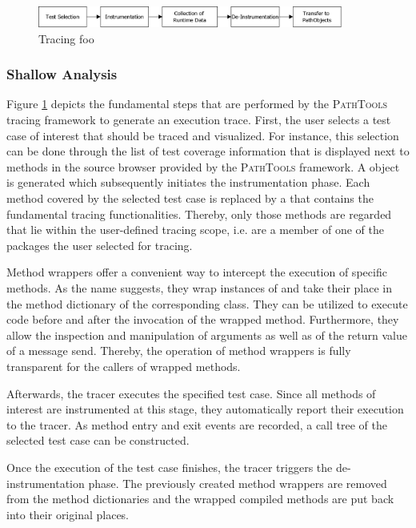 \begin{figure}[tb]
	\centering
	\includegraphics[width=0.9\textwidth]{../images/02-TracingProcess}
	\caption[TOC Caption]{Tracing foo}
	\label{fig:BackgroundTracingApproach}
\end{figure}

\subsubsection{Shallow Analysis}
Figure \ref{fig:BackgroundTracingApproach} depicts the fundamental steps that are performed by the \textsc{PathTools} tracing framework to generate an execution trace.
First, the user selects a test case of interest that should be traced and visualized.
For instance, this selection can be done through the list of test coverage information that is displayed next to methods in the source browser provided by the \textsc{PathTools} framework.
A  object is generated which subsequently initiates the instrumentation phase.
Each method covered by the selected test case is replaced by a  that contains the fundamental tracing functionalities.
Thereby, only those methods are regarded that lie within the user-defined tracing scope, i.e. are a member of one of the packages the user selected for tracing.

Method wrappers \cite{brant_wrappers_1998} offer a convenient way to intercept the execution of specific methods.
As the name suggests, they wrap instances of  and take their place in the method dictionary of the corresponding class.
They can be utilized to execute code before and after the invocation of the wrapped method.
Furthermore, they allow the inspection and manipulation of arguments as well as of the return value of a message send.
Thereby, the operation of method wrappers is fully transparent for the callers of wrapped methods.

Afterwards, the tracer executes the specified test case.
Since all methods of interest are instrumented at this stage, they automatically report their execution to the tracer.
As method entry and exit events are recorded, a call tree of the selected test case can be constructed.

Once the execution of the test case finishes, the tracer triggers the de-instrumentation phase.
The previously created method wrappers are removed from the method dictionaries and the wrapped compiled methods are put back into their original places.

